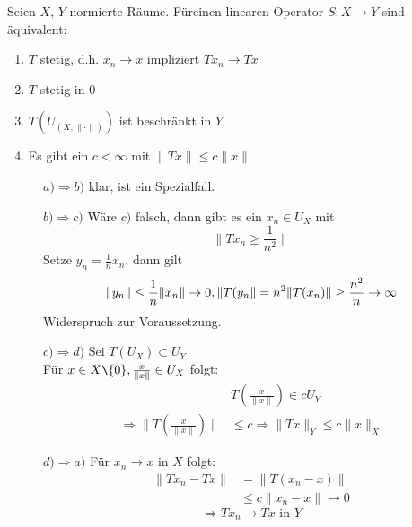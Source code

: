 \begin{satz}
	Seien $X$, $Y$ normierte Räume. Füreinen linearen Operator $S: X \rightarrow Y$ sind äquivalent:
	\begin{enumerate}[label=\alph*\upshape)]
		\item $T$ stetig, d.h. $x_{n} \rightarrow x$ impliziert $Tx_{n} \rightarrow Tx$
		\item $T$ stetig in 0
		\item $T(U_{(X, \| \cdot \|)})$ ist beschränkt in $Y$
		\item Es gibt ein $c < \infty$ mit $\| Tx \| \leq c \| x \|$
	\end{enumerate}	
\end{satz}
\begin{beweis}
	\begin{description}
		\item[] $a) \Rightarrow b)$ klar, ist ein Spezialfall.
		\item[] $b) \Rightarrow c)$ Wäre $c)$ falsch, dann gibt es ein $x_{n} \in U_{X}$ mit 
		\[ \| T x_{n} \geq \frac{1}{n^{2}} \| \]
		Setze $y_{n} = \frac{1}{n} x_{n}$, dann gilt
		\[
			\| y_{n} \| \leq \frac{1}{n} \| x_{n} \| \rightarrow 0, \\
			\| T(y_{n} \| = n^{2} \| T(x_{n}) \| \geq \frac{n^2}{n} \rightarrow \infty 
		 \]
		 Widerspruch zur Voraussetzung.
		 \item[] $c) \Rightarrow d)$ Sei $T(U_{X}) \subset U_{Y}$ \\
		 Für $x \in X \verb|\| \{0\}, \frac{x}{\| x \|} \in U_{X}$ folgt:
		 \begin{align*}
		 	&T \left( \frac{x}{\| x \|} \right) \in c U_{Y} \\
		 	\Rightarrow \| T \left( \frac{x}{\| x \|} \right) \| & \leq c
		 	\Rightarrow \| T x \|_{Y} \leq c \| x \|_{X}			
		 \end{align*}
		 \item[] $d) \Rightarrow a)$ Für $x_{n} \rightarrow x$ in $X$ folgt:
		 \begin{align*}
		 	\| T x_{n} - T x \| & = \| T ( x_{n} - x ) \| \\
		 						& \leq c \| x_{n} - x \| \rightarrow 0
		 \end{align*} \[ \Rightarrow T x_{n} \rightarrow T x \text{ in } Y \]
	\end{description}
\end{beweis}
	
